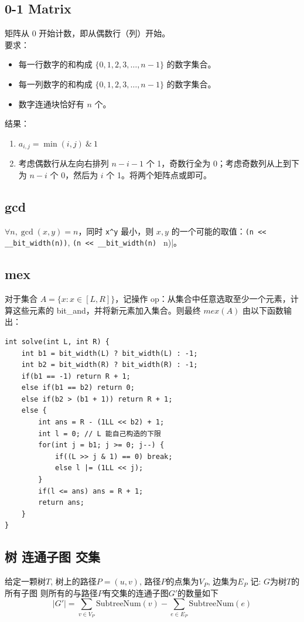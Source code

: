 \documentclass[openany,a4paper]{book}
\begin{document}
\subsection*{0-1 Matrix}
矩阵从 0 开始计数，即从偶数行（列）开始。\\
要求：
\begin{itemize}
    \item 每一行数字的和构成 $\{0,1,2,3,\dots,n-1\}$ 的数字集合。
    \item 每一列数字的和构成 $\{0,1,2,3,\dots,n-1\}$ 的数字集合。
    \item 数字连通块恰好有 $n$ 个。
\end{itemize}
结果：
\begin{enumerate}
    \item $a_{i,j} = \min(i,j) \ \& \ 1$
    \item 考虑偶数行从左向右排列 $n-i-1$ 个 1，奇数行全为 0；考虑奇数列从上到下为 $n-i$ 个 0，然后为 $i$ 个 1。将两个矩阵点或即可。
\end{enumerate}

\subsection*{gcd}
$\forall n, \gcd(x,y)=n$，同时 \verb|x^y| 最小，则 $x,y$ 的一个可能的取值：\verb|(n << __bit_width(n))|, \verb|(n << __bit_width(n) | n)|。

\subsection*{mex}
对于集合 $A = \{x: x \in [L,R]\}$，记操作 op：从集合中任意选取至少一个元素，计算这些元素的 bit\_and，并将新元素加入集合。则最终 $mex(A)$ 由以下函数输出：
\begin{verbatim}
int solve(int L, int R) {
    int b1 = bit_width(L) ? bit_width(L) : -1;
    int b2 = bit_width(R) ? bit_width(R) : -1;
    if(b1 == -1) return R + 1;
    else if(b1 == b2) return 0;
    else if(b2 > (b1 + 1)) return R + 1;
    else {
        int ans = R - (1LL << b2) + 1;
        int l = 0; // L 能自己构造的下限
        for(int j = b1; j >= 0; j--) {
            if((L >> j & 1) == 0) break;
            else l |= (1LL << j);
        }
        if(l <= ans) ans = R + 1;
        return ans;
    }
}
\end{verbatim}

\subsection*{树 连通子图 交集}
给定一颗树$T$, 树上的路径$P = (u,v)$, 路径$P$的点集为$V_P$, 边集为$E_P$
记: $G$为树$T$的所有子图
则所有的与路径$P$有交集的连通子图$G'$的数量如下
$$
    |G'| = \sum_{v \in V_P} \text{SubtreeNum}(v) - \sum_{e \in E_P} \text{SubtreeNum}(e)
$$
\end{document}
